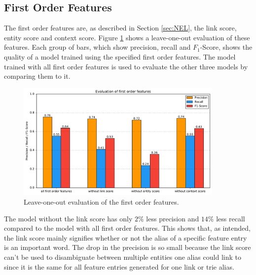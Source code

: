 \subsection{First Order Features}
The first order features are, as described in Section \ref{sec:NEL}, the link score, entity score and context score. Figure \ref{fo_eval} shows a leave-one-out evaluation of these features. Each group of bars, which show precision, recall and $F_1$-Score, shows the quality of a model trained using the specified first order features. The model trained with all first order features is used to evaluate the other three models by comparing them to it.\par
\begin{figure}[H]
	\centering
	\includegraphics[width=0.9\textwidth]{img/first_order_eval}
	\caption{Leave-one-out evaluation of the first order features.}
	\label{fo_eval}
\end{figure}
The model without the link score has only $2\%$ less precision and $14\%$ less recall compared to the model with all first order features. This shows that, as intended, the link score mainly signifies whether or not the alias of a specific feature entry is an important word. The drop in the precision is so small because the link score can't be used to disambiguate between multiple entities one alias could link to since it is the same for all feature entries generated for one link or trie alias.\par
